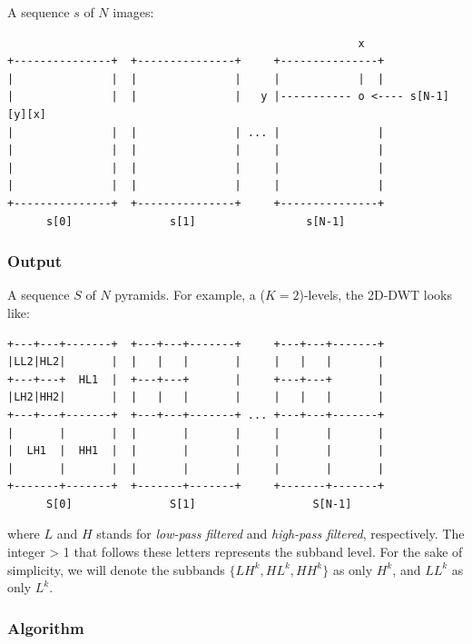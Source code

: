 A sequence \(s\) of \(N\) images:

\begin{verbatim}
                                                      x 
+---------------+  +---------------+     +---------------+
|               |  |               |     |            |  |
|               |  |               |   y |----------- o <---- s[N-1][y][x]
|               |  |               | ... |               |
|               |  |               |     |               |
|               |  |               |     |               |
|               |  |               |     |               |
+---------------+  +---------------+     +---------------+
      s[0]               s[1]                 s[N-1]
\end{verbatim}

\hypertarget{output}{%
\subsubsection{Output}\label{output}}

A sequence \(S\) of \(N\) pyramids. For example, a (\(K=2\))-levels, the
2D-DWT looks like:

\begin{verbatim}
+---+---+-------+  +---+---+-------+     +---+---+-------+
|LL2|HL2|       |  |   |   |       |     |   |   |       |
+---+---+  HL1  |  +---+---+       |     +---+---+       |
|LH2|HH2|       |  |   |   |       |     |   |   |       |
+---+---+-------+  +---+---+-------+ ... +---+---+-------+
|       |       |  |       |       |     |       |       |
|  LH1  |  HH1  |  |       |       |     |       |       |
|       |       |  |       |       |     |       |       |        
+-------+-------+  +-------+-------+     +-------+-------+
      S[0]               S[1]                  S[N-1]
\end{verbatim}

where \(L\) and \(H\) stands for \emph{low-pass filtered} and
\emph{high-pass filtered}, respectively. The integer \textgreater{} 1
that follows these letters represents the subband level. For the sake of
simplicity, we will denote the subbands \(\{LH^k, HL^k, HH^k\}\) as only
\(H^k\), and \(LL^k\) as only \(L^k\).

    \hypertarget{algorithm}{%
\subsubsection{Algorithm}\label{algorithm}}

